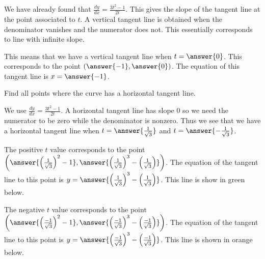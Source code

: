 \documentclass{ximera}
\begin{document}
\begin{exercise}
\begin{exercise}
We have already found that $\frac{dy}{dx}=\frac{3t^2-1}{2t}$. This gives the slope of the tangent line at the point associated to $t$. A vertical tangent line is obtained when the denominator vanishes and the numerator does not. This essentially corresponds to line with infinite slope. 

This means that we have a vertical tangent line when $t=\answer{0}$. This corresponds to the point $(\answer{-1}, \answer{0})$.  The equation of this tangent line is $x=\answer{-1}$. 

\begin{image}  
\end{image} 

\begin{exercise}

Find all points where the curve has a horizontal tangent line. 

We use $\frac{dy}{dx}=\frac{3t^2-1}{2t}$. A horizontal tangent line has slope $0$ so we need the numerator to be zero while the denominator is nonzero. Thus we see that 
we have a horizontal tangent line when $t=\answer{\frac{1}{\sqrt{3}}}$ and $t=\answer{-\frac{1}{\sqrt{3}}}$. 

The positive $t$ value corresponds to the point $\left( \answer{ \left( \frac{1}{\sqrt{3}} \right)^2-1 } ,  \answer{ \left( \frac{1}{\sqrt{3}} \right)^3 -   \left( \frac{1}{\sqrt{3}} \right)   } \right)$. The equation of the tangent line to this point is $y=\answer{ \left( \frac{1}{\sqrt{3}} \right)^3 -   \left( \frac{1}{\sqrt{3}} \right) }$. This line is show in green below. 


The negative $t$ value corresponds to the point $\left( \answer{ \left( \frac{-1}{\sqrt{3}} \right)^2-1 } ,  \answer{ \left( \frac{-1}{\sqrt{3}} \right)^3 -   \left( \frac{-1}{\sqrt{3}} \right)   } \right)$. 
The equation of the tangent line to this point is $y=\answer{ \left( \frac{-1}{\sqrt{3}} \right)^3 -   \left( \frac{-1}{\sqrt{3}} \right) }$. This line is shown in orange below. 







\end{exercise}
\end{exercise}
\end{exercise}
\end{document}
